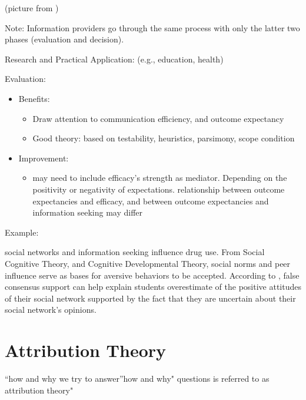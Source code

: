 \documentclass[
]{book}
\providecommand{\tightlist}{%
  \setlength{\itemsep}{0pt}\setlength{\parskip}{0pt}}
\begin{document}
(picture from \citep{Baxter_2008})

Note: Information providers go through the same process with only the latter two phases (evaluation and decision).

Research and Practical Application: (e.g., education, health)

Evaluation:

\begin{itemize}
\item
  Benefits:

  \begin{itemize}
  \tightlist
  \item
    Draw attention to communication efficiency, and outcome expectancy\\
  \item
    Good theory: based on testability, heuristics, parsimony, scope condition\\
  \end{itemize}
\item
  Improvement:

  \begin{itemize}
  \tightlist
  \item
    may need to include efficacy's strength as mediator. Depending on the positivity or negativity of expectations. relationship between outcome expectancies and efficacy, and between outcome expectancies and information seeking may differ
  \end{itemize}
\end{itemize}

Example:

\citep{Morse_2013} social networks and information seeking influence drug use. From Social Cognitive Theory, and Cognitive Developmental Theory, social norms and peer influence serve as bases for aversive behaviors to be accepted. According to \citep{Wolfson_2000}, false consensus support can help explain students overestimate of the positive attitudes of their social network supported by the fact that they are uncertain about their social network's opinions.

\hypertarget{attribution-theory}{%
\section{Attribution Theory}\label{attribution-theory}}

``how and why we try to answer''how and why" questions is referred to as attribution theory" \citep{Baxter_2008}
\end{document}
